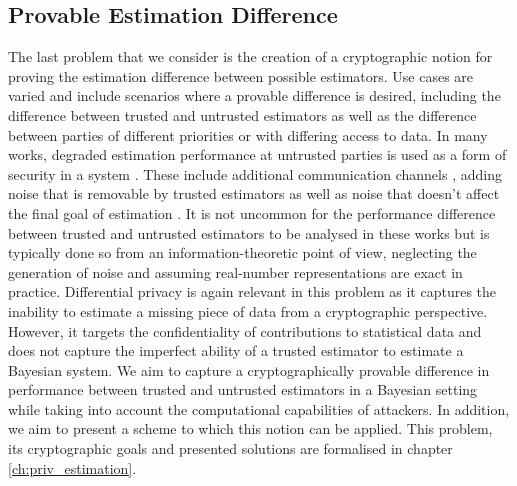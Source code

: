 % 
% 

\subsection{Provable Estimation Difference}\label{subsec:intro:provable_est_perf}
The last problem that we consider is the creation of a cryptographic notion for proving the estimation difference between possible estimators. Use cases are varied and include scenarios where a provable difference is desired, including the difference between trusted and untrusted estimators as well as the difference between parties of different priorities or with differing access to data. In many works, degraded estimation performance at untrusted parties is used as a form of security in a system \cite{specialePrivacyPreservingImageBased2019,liPrivacyPreservingDistributedOptimization2020,leongTransmissionSchedulingRemote2019,leongInformationBoundsState2019,grovesPrinciplesGNSSInertial2015}. These include additional communication channels \cite{leongInformationBoundsState2019,grovesPrinciplesGNSSInertial2015}, adding noise that is removable by trusted estimators \cite{murguiaInformationTheoreticPrivacyChaos2020,leongUseArtificialNoise2018} as well as noise that doesn't affect the final goal of estimation \cite{liPrivacyPreservingDistributedOptimization2020}. It is not uncommon for the performance difference between trusted and untrusted estimators to be analysed in these works \cite{hePreservingDataPrivacyAdded2018,murguiaInformationTheoreticPrivacyChaos2020,sinopoliKalmanFilteringIntermittent2004,mishraSecureStateEstimation2015} but is typically done so from an information-theoretic point of view, neglecting the generation of noise and assuming real-number representations are exact in practice. Differential privacy \cite{dworkDifferentialPrivacySurvey2008} is again relevant in this problem as it captures the inability to estimate a missing piece of data from a cryptographic perspective. However, it targets the confidentiality of contributions to statistical data and does not capture the imperfect ability of a trusted estimator to estimate a Bayesian system. We aim to capture a cryptographically provable difference in performance between trusted and untrusted estimators in a Bayesian setting while taking into account the computational capabilities of attackers. In addition, we aim to present a scheme to which this notion can be applied. This problem, its cryptographic goals and presented solutions are formalised in chapter \ref{ch:priv_estimation}.

